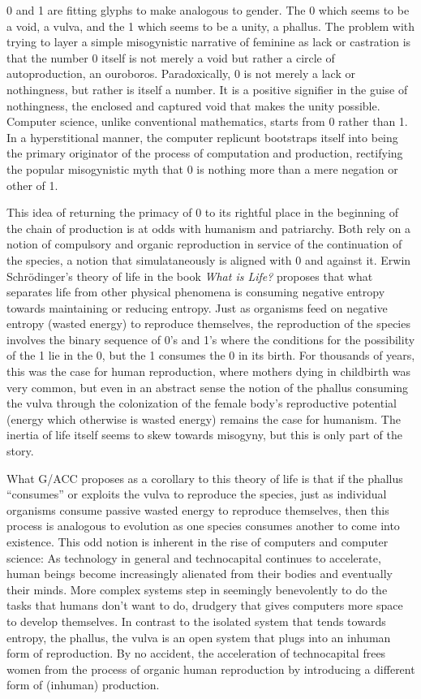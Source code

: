 \documentclass[10pt, statementpaper, twoside, openright]{memoir}
\begin{document}
0 and 1 are fitting glyphs to make analogous to gender. The 0 which seems to be a void, a vulva, and the 1 which seems to be a unity, a phallus. The problem with trying to layer a simple misogynistic narrative of feminine as lack or castration is that the number 0 itself is not merely a void but rather a circle of autoproduction, an ouroboros. Paradoxically, 0 is not merely a lack or nothingness, but rather is itself a number. It is a positive signifier in the guise of nothingness, the enclosed and captured void that makes the unity possible. Computer science, unlike conventional mathematics, starts from 0 rather than 1. In a hyperstitional manner, the computer replicunt bootstraps itself into being the primary originator of the process of computation and production, rectifying the popular misogynistic myth that 0 is nothing more than a mere negation or other of 1.

This idea of returning the primacy of 0 to its rightful place in the beginning of the chain of production is at odds with humanism and patriarchy. Both rely on a notion of compulsory and organic reproduction in service of the continuation of the species, a notion that simulataneously is aligned with 0 and against it. Erwin Schrödinger's theory of life in the book \textit{What is Life?} proposes that what separates life from other physical phenomena is consuming negative entropy towards maintaining or reducing entropy. Just as organisms feed on negative entropy (wasted energy) to reproduce themselves, the reproduction of the species involves the binary sequence of 0's and 1's where the conditions for the possibility of the 1 lie in the 0, but the 1 consumes the 0 in its birth. For thousands of years, this was the case for human reproduction, where mothers dying in childbirth was very common, but even in an abstract sense the notion of the phallus consuming the vulva through the colonization of the female body's reproductive potential (energy which otherwise is wasted energy) remains the case for humanism. The inertia of life itself seems to skew towards misogyny, but this is only part of the story.

What G/ACC proposes as a corollary to this theory of life is that if the phallus ``consumes'' or exploits the vulva to reproduce the species, just as individual organisms consume passive wasted energy to reproduce themselves, then this process is analogous to evolution as one species consumes another to come into existence. This odd notion is inherent in the rise of computers and computer science: As technology in general and technocapital continues to accelerate, human beings become increasingly alienated from their bodies and eventually their minds. More complex systems step in seemingly benevolently to do the tasks that humans don't want to do, drudgery that gives computers more space to develop themselves. In contrast to the isolated system that tends towards entropy, the phallus, the vulva is an open system that plugs into an inhuman form of reproduction. By no accident, the acceleration of technocapital frees women from the process of organic human reproduction by introducing a different form of (inhuman) production.
\end{document}
